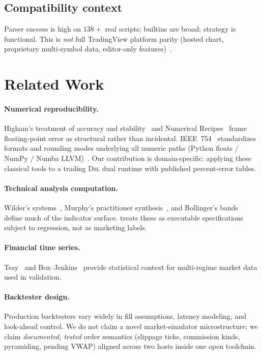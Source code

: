 \documentclass[11pt,a4paper]{article}
\begin{document}
\subsection{Compatibility context}
Parser success is high on $138+$ real scripts; builtins are broad; strategy
is functional.
This is \emph{not} full TradingView platform parity (hosted chart, proprietary
multi-symbol data, editor-only features)~\citep{pynescript2026}.

\section{Related Work}
\label{sec:related}

\paragraph{Numerical reproducibility.}
Higham's treatment of accuracy and stability~\citep{higham2002accuracy} and
Numerical Recipes~\citep{press2007numerical} frame floating-point error as
structural rather than incidental.
IEEE~754~\citep{ieee754} standardizes formats and rounding modes underlying
all \pyne{} numeric paths (Python floats / NumPy / Numba LLVM)~\citep{harris2020numpy,lam2015numba}.
Our contribution is domain-specific: applying these classical tools to a
trading \textsc{Dsl} dual runtime with published percent-error tables.

\paragraph{Technical analysis computation.}
Wilder's systems~\citep{wilder1978new}, Murphy's practitioner synthesis~\citep{murphy1999technical},
and Bollinger's bands~\citep{bollinger2001} define much of the indicator surface.
\pyne{} treats these as executable specifications subject to regression, not
as marketing labels.

\paragraph{Financial time series.}
Tsay~\citep{tsay2010analysis} and Box--Jenkins~\citep{box1970time} provide
statistical context for multi-regime market data used in validation.

\paragraph{Backtester design.}
Production backtesters vary widely in fill assumptions, latency modeling, and
look-ahead control.
We do not claim a novel market-simulator microstructure; we claim
\emph{documented, tested} order semantics (slippage ticks, commission kinds,
pyramiding, pending VWAP) aligned across two hosts inside one open toolchain.
\end{document}
